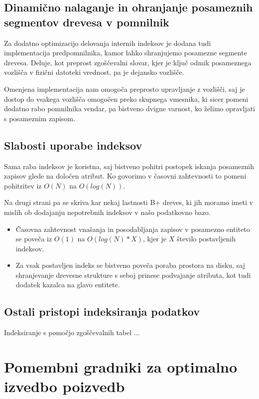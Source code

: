 \documentclass[a4paper,12pt,openright]{book}
\begin{document}
        \subsection{Dinamično nalaganje in ohranjanje posameznih segmentov drevesa v pomnilnik}
        Za dodatno optimizacijo delovanja internih indeksov je dodana tudi implementacija predpomnilnika, kamor lahko shranjujemo posamezne segmente drevesa. Deluje, kot preprost zgoščevalni slovar, kjer je ključ odmik posameznega vozlišča v fizični datoteki vrednost, pa je dejansko vozlišče.

        Omenjena implementacija nam omogoča preprosto upravljanje z vozlišči, saj je dostop do vsakega vozlišča omogočen preko skupnega vmesnika, ki sicer pomeni dodatno rabo pomnilnika vendar, pa bistveno dvigne varnost, ko želimo opravljati s posameznim zapisom.
        
        \subsection{Slabosti uporabe indeksov}

        Sama raba indeksov je koristna, saj bistveno pohitri postopek iskanja posameznih zapisov glede na določen atribut. Ko govorimo v časovni zahtevnosti to pomeni pohitritev iz $O(N)$ na $O(log(N))$.

        Na drugi strani pa se skriva kar nekaj lastnosti B+ dreves, ki jih moramo imeti v mislih ob dodajanju nepotrebnih indeksov v našo podatkovno bazo.
        \begin{itemize}
            \item Časovna zahtevnost vnašanja in posodabljanja zapisov v posamezno entiteto se poveča iz $O(1)$ na $O(log(N) * X)$, kjer je $X$ število postavljenih indeksov.
            \item Za vsak postavljen indeks se bistveno poveča poraba prostora na disku, saj shranjevanje drevesne strukture s seboj prinese podvajanje atributa, kot tudi dodatek kazalca na glavo entitete.
        \end{itemize}

        \subsection{Ostali pristopi indeksiranja podatkov}
        \colorbox{BurntOrange}{Indeksiranje s pomočjo zgoščevalnih tabel ...}
        
    \section{Pomembni gradniki za optimalno izvedbo poizvedb}
\end{document}
